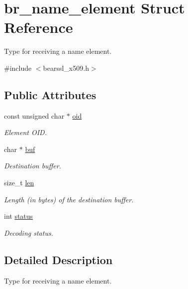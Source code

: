 \hypertarget{structbr__name__element}{}\section{br\+\_\+name\+\_\+element Struct Reference}
\label{structbr__name__element}


Type for receiving a name element.  




{\ttfamily \#include $<$bearssl\+\_\+x509.\+h$>$}

\subsection*{Public Attributes}
\begin{DoxyCompactItemize}
\item 
const unsigned char $\ast$ \hyperlink{structbr__name__element_ae21b72b8ccfe1f2da35a43d307e16a76}{oid}
\begin{DoxyCompactList}\small\item\em Element O\+ID. \end{DoxyCompactList}\item 
\mbox{\label{structbr__name__element_a63622d35b5d168c6bbcdf28d50b32210}} 
char $\ast$ \hyperlink{structbr__name__element_a63622d35b5d168c6bbcdf28d50b32210}{buf}
\begin{DoxyCompactList}\small\item\em Destination buffer. \end{DoxyCompactList}\item 
size\+\_\+t \hyperlink{structbr__name__element_a4dfc9930093f0dbbaa94dd8684d58716}{len}
\begin{DoxyCompactList}\small\item\em Length (in bytes) of the destination buffer. \end{DoxyCompactList}\item 
int \hyperlink{structbr__name__element_a19c2c4bf8e97473e995130193eec553b}{status}
\begin{DoxyCompactList}\small\item\em Decoding status. \end{DoxyCompactList}\end{DoxyCompactItemize}


\subsection{Detailed Description}
Type for receiving a name element. 

